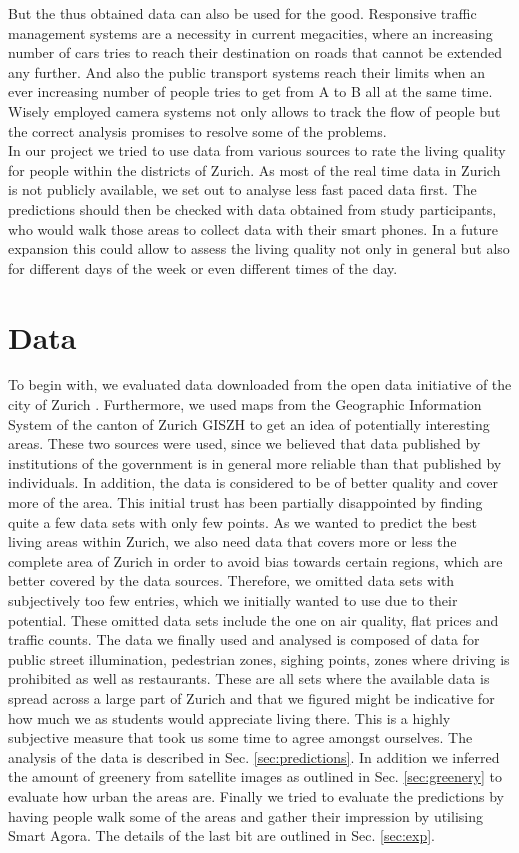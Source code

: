 \documentclass[letterpaper]{article}
\begin{document}
\indent But the thus obtained data can also be used for the good. Responsive traffic management systems are a necessity in current megacities, where an increasing number of cars tries to reach their destination on roads that cannot be extended any further. And also the public transport systems reach their limits when an ever increasing number of people tries to get from A to B all at the same time. Wisely employed camera systems not only allows to track the flow of people but the correct analysis promises to resolve some of the problems.\\
\indent In our project we tried to use data from various sources to rate the living quality for people within the districts of Zurich. As most of the real time data in Zurich is not publicly available, we set out to analyse less fast paced data first. The predictions should then be checked with data obtained from study participants, who would walk those areas to collect data with their smart phones. In a future expansion this could allow to assess the living quality not only in general but also for different days of the week or even different times of the day.

\section{Data}\label{sec:data}
To begin with, we evaluated data downloaded from the open data initiative of the city of Zurich \cite{ZurichOD}.
Furthermore, we used maps from the Geographic Information System of the canton of Zurich GISZH \cite{GISZH} to get
an idea of potentially interesting areas.
These two sources were used, since we believed that data published by institutions of the government is in general
more reliable than that published by individuals. In addition, the data is considered to be of better quality and
cover more of the area. This initial trust has been partially disappointed by finding quite a few data sets with only few points.
As we wanted to predict the best living areas within Zurich, we also need data that covers more or less the complete area of Zurich
in order to avoid bias towards certain regions, which are better covered by the data sources. Therefore, we omitted data sets
with subjectively too few entries, which we initially wanted to use due to their potential. These omitted data sets include
the one on air quality, flat prices and traffic counts.
The data we finally used and analysed is composed of data for public street illumination, pedestrian zones, sighing points,
zones where driving is prohibited as well as restaurants. These are all sets where the available data is spread across
a large part of Zurich and that we figured might be indicative for how much we as students would appreciate living there.
This is a highly subjective measure that took us some time to agree amongst ourselves.
The analysis of the data is described in Sec. \ref{sec:predictions}. In addition we inferred the amount of greenery from satellite
images as outlined in Sec. \ref{sec:greenery} to evaluate how urban the areas are. Finally we tried to evaluate the predictions
by having people walk some of the areas and gather their impression by utilising Smart Agora. The details of the last bit
are outlined in Sec. \ref{sec:exp}.
\end{document}
